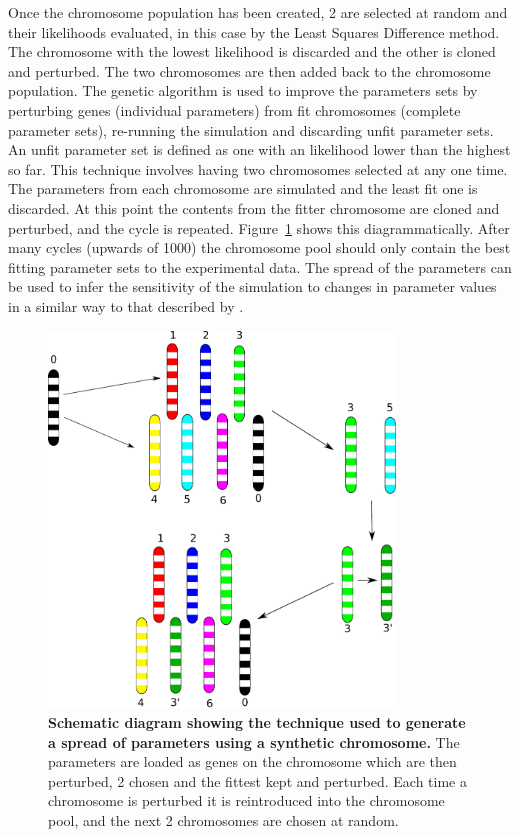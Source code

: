 Once the chromosome population has been created, 2 are selected at random and their likelihoods evaluated, in this case by the Least Squares Difference method. The chromosome with the lowest likelihood is discarded and the other is cloned and perturbed. The two chromosomes are then added back to the chromosome population. The genetic algorithm is used to improve the parameters sets by perturbing genes (individual parameters) from fit chromosomes (complete parameter sets), re-running the simulation and discarding unfit parameter sets. An unfit parameter set is defined as one with an likelihood lower than the highest so far. This technique involves having two chromosomes selected at any one time. The parameters from each chromosome are simulated and the least fit one is discarded. At this point the contents from the fitter chromosome are cloned and perturbed, and the cycle is repeated. Figure~\ref{fig:sa_spread} shows this diagrammatically. After many cycles (upwards of 1000) the chromosome pool should only contain the best fitting parameter sets to the experimental data. The spread of the parameters can be used to infer the sensitivity of the simulation to changes in parameter values in a similar way to that described by \citet{Toni2009}.
\begin{figure}[tbp]
\begin{center}
\includegraphics[height=10cm]{./03-parameterestimationmethodologies/data/sa_spread.pdf}
\end{center}
\caption[{Schematic diagram showing the technique used to generate a spread of parameters using a synthetic chromosome.}]{{\bf Schematic diagram showing the technique used to generate a spread of parameters using a synthetic chromosome.} The parameters are loaded as genes on the chromosome which are then perturbed, 2 chosen and the fittest kept and perturbed. Each time a chromosome is perturbed it is reintroduced into the chromosome pool, and the next 2 chromosomes are chosen at random.
\label{fig:sa_spread}}
\end{figure}
